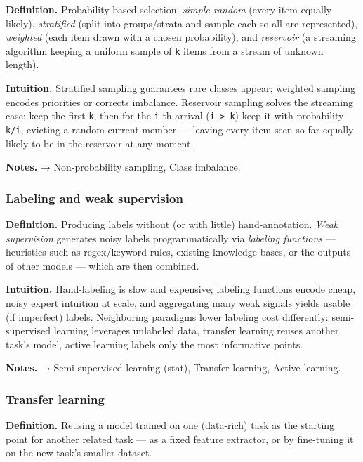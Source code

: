 \documentclass[
  10pt,
  letterpaper,
  onecolumn]{article}
\begin{document}
\textbf{Definition.} Probability-based selection: \emph{simple random}
(every item equally likely), \emph{stratified} (split into groups/strata
and sample each so all are represented), \emph{weighted} (each item
drawn with a chosen probability), and \emph{reservoir} (a streaming
algorithm keeping a uniform sample of \texttt{k} items from a stream of
unknown length).

\textbf{Intuition.} Stratified sampling guarantees rare classes appear;
weighted sampling encodes priorities or corrects imbalance. Reservoir
sampling solves the streaming case: keep the first \texttt{k}, then for
the \texttt{i}-th arrival (\texttt{i\ \textgreater{}\ k}) keep it with
probability \texttt{k/i}, evicting a random current member --- leaving
every item seen so far equally likely to be in the reservoir at any
moment.

\textbf{Notes.} → Non-probability sampling, Class imbalance.

\hypertarget{labeling-and-weak-supervision}{%
\subsubsection{Labeling and weak
supervision}\label{labeling-and-weak-supervision}}

\textbf{Definition.} Producing labels without (or with little)
hand-annotation. \emph{Weak supervision} generates noisy labels
programmatically via \emph{labeling functions} --- heuristics such as
regex/keyword rules, existing knowledge bases, or the outputs of other
models --- which are then combined.

\textbf{Intuition.} Hand-labeling is slow and expensive; labeling
functions encode cheap, noisy expert intuition at scale, and aggregating
many weak signals yields usable (if imperfect) labels. Neighboring
paradigms lower labeling cost differently: semi-supervised learning
leverages unlabeled data, transfer learning reuses another task's model,
active learning labels only the most informative points.

\textbf{Notes.} → Semi-supervised learning (stat), Transfer learning,
Active learning.

\hypertarget{transfer-learning}{%
\subsubsection{Transfer learning}\label{transfer-learning}}

\textbf{Definition.} Reusing a model trained on one (data-rich) task as
the starting point for another related task --- as a fixed feature
extractor, or by fine-tuning it on the new task's smaller dataset.
\end{document}
